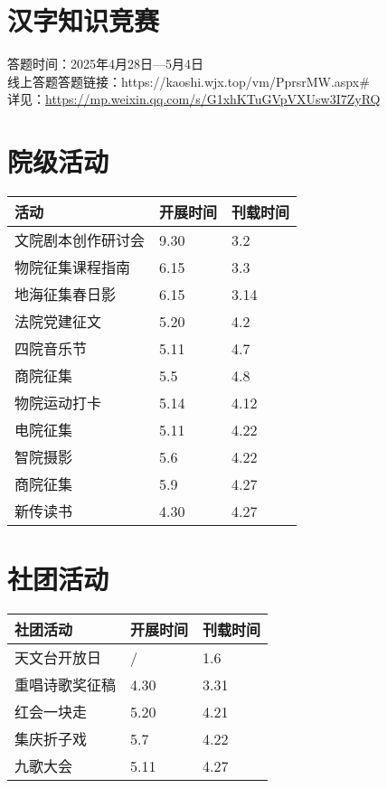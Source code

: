 \documentclass[letterpaper, 12pt]{article}
\begin{document}
\begin{multicols}{2}
\section{汉字知识竞赛} %
答题时间：2025年4月28日—5月4日
\\线上答题答题链接：https://kaoshi.wjx.top/vm/PprsrMW.aspx\#
\\详见：\url{https://mp.weixin.qq.com/s/G1xhKTuGVpVXUsw3I7ZyRQ}

\section{院级活动}
\begin{tabular}{|>{\centering\arraybackslash}m{}|m{}|m{}|}
\hline
    活动 & 开展时间 & 刊载时间\\
    \hline\hline
    文院剧本创作研讨会 & 9.30 & 3.2\\
    物院征集课程指南 & 6.15 & 3.3\\
    地海征集春日影 & 6.15 & 3.14\\
    法院党建征文 & 5.20 & 4.2\\
    四院音乐节 & 5.11 & 4.7\\
    商院征集 & 5.5 & 4.8\\
    物院运动打卡 & 5.14 & 4.12\\
    电院征集 & 5.11 & 4.22\\
    智院摄影 & 5.6 & 4.22\\
    商院征集 & 5.9 & 4.27\\
    新传读书 & 4.30 & 4.27\\
    \hline
\end{tabular}

\section{社团活动}
\begin{tabular}{|>{\centering\arraybackslash}m{}|m{}|m{}|}
    \hline
    社团活动 & 开展时间 & 刊载时间\\
    \hline\hline
    天文台开放日 & / & 1.6\\
    重唱诗歌奖征稿 & 4.30 & 3.31\\
    红会一块走 & 5.20 & 4.21\\
    集庆折子戏 & 5.7 & 4.22\\
    九歌大会 & 5.11 & 4.27\\
    \hline
\end{tabular}

\end{multicols}
\end{document}
